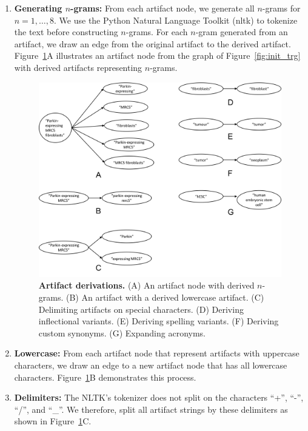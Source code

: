 \begin{enumerate}
\item \textbf{Generating $n$-grams:} From each artifact node, we generate all $n$-grams for $n = 1,\dots,8$. We use the Python Natural Language Toolkit (nltk) to tokenize the text before constructing $n$-grams.  For each $n$-gram generated from an artifact, we draw an edge from the original artifact to the derived artifact. Figure~\ref{fig:stages_1}A illustrates an artifact node from the graph of Figure~\ref{fig:init_trg} with derived artifacts representing $n$-grams. 

\begin{figure}[htbp]
\centering
\includegraphics[width=13cm]{figures/stages_1.png} 
\caption{\textbf{Artifact derivations.} (A) An artifact node with derived $n$-grams. (B) An artifact with a derived lowercase artifact. (C) Delimiting artifacts on special characters. (D) Deriving inflectional variants. (E) Deriving spelling variants. (F) Deriving custom synonyms. (G) Expanding acronyms.}
\label{fig:stages_1}
\end{figure}

\item \textbf{Lowercase:} From each artifact node that represent artifacts with uppercase characters, we draw an edge to a new artifact node that has all lowercase characters. Figure~\ref{fig:stages_1}B demonstrates this process.

\item \textbf{Delimiters:} The NLTK's tokenizer does not split on the characters ``+'', ``-'', ``/'', and ``\_''.  We therefore, split all artifact strings by these delimiters as shown in Figure~\ref{fig:stages_1}C.  


\end{enumerate}

